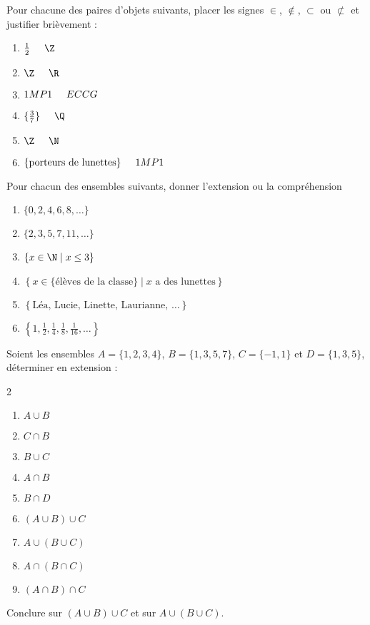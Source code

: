 \begin{exercice}Pour chacune des paires d'objets suivants, placer les signes $\in$, $\notin$, $\subset$ ou $\not \subset$ et justifier brièvement :
	\begin{enumerate}
	\item $\frac{1}{2} \hspace{5mm} \Z$
	\item $\Z \hspace{5mm} \R$
	\item $1MP1 \hspace{5mm} ECCG$
	\item $\{\frac{3}{7}\} \hspace{5mm} \Q$
	\item $\Z \hspace{5mm} \N$
	\item $\{\mbox{porteurs de lunettes}\} \hspace{5mm} 1MP1$
	\end{enumerate}
\end{exercice}

\begin{exercice}
Pour chacun des ensembles suivants, donner l'extension ou la compréhension
	\begin{enumerate}
	\item
	$
	\{0,2,4,6,8,\dots\}
	$
	\item
	$
	\{2,3,5,7,11,\dots \}
	$
	\item
	$
	\left\{ x\in \N \; | \; x\leq 3\right\}
	$
	\item
	$
	\left\{ x\in \{ \mbox{élèves de la classe} \} \; | \; x \mbox{ a des lunettes} \right\}
	$
	\item
	$
	\left\{ \mbox{Léa, Lucie, Linette, Laurianne, } \dots \right\}
	$
	\item 
	$
	\left\{1, \frac{1}{2}, \frac{1}{4}, \frac{1}{8}, \frac{1}{16}, \dots \right\}
	$
	\end{enumerate}
\end{exercice}

\begin{exercice}
Soient les ensembles $A=\{1,2,3,4\}$, $B=\{1,3,5,7\}$, $C= \{-1,1\}$ et $D = \{1,3,5\}$, déterminer en extension :
\begin{multicols}2
	\begin{enumerate}
	\item $ A\cup B$
	\item $ C \cap B $
	\item $ B \cup C $
	\item $ A \cap B $
	\item $ B \cap D $
	\item $ (A\cup B)\cup C $
	\item $ A \cup (B\cup C)$
	\item $ A \cap (B\cap C)$
	\item $ (A \cap B) \cap C $
	\end{enumerate}
\end{multicols}
Conclure sur $ (A\cup B)\cup C $ et sur $ A \cup (B \cup C) $.
\end{exercice}
\newpage
